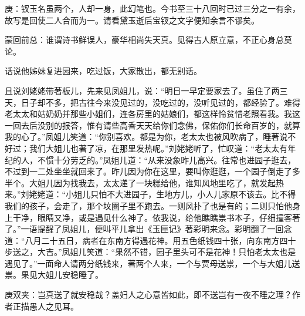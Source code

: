 

\begin{parag}
    \begin{note}庚：钗玉名虽两个，人却一身，此幻笔也。今书至三十八回时已过三分之一有余，故写是回使二人合而为一。请看黛玉逝后宝钗之文字便知余言不谬矣。\end{note}
\end{parag}


\begin{parag}
    \begin{note}蒙回前总：谁谓诗书鲜误人，豪华相尚失天真。见得古人原立意，不正心身总莫论。\end{note}
\end{parag}


\begin{parag}
    话说他姊妹复进园来，吃过饭，大家散出，都无别话。
\end{parag}


\begin{parag}
    且说刘姥姥带著板儿，先来见凤姐儿，说：“明日一早定要家去了。虽住了两三天，日子却不多，把古往今来没见过的，没吃过的，没听见过的，都经验了。难得老太太和姑奶奶并那些小姐们，连各房里的姑娘们，都这样怜贫惜老照看我。我这一回去后没别的报答，惟有请些高香天天给你们念佛，保佑你们长命百岁的，就算我的心了。”凤姐儿笑道：“你别喜欢。都是为你，老太太也被风吹病了，睡著说不好过；我们大姐儿也著了凉，在那里发热呢。”刘姥姥听了，忙叹道：“老太太有年纪的人，不惯十分劳乏的。”凤姐儿道：“从来没象昨儿高兴。往常也进园子逛去，不过到一二处坐坐就回来了。昨儿因为你在这里，要叫你逛逛，一个园子倒走了多半个。大姐儿因为找我去，太太递了一块糕给他，谁知风地里吃了，就发起热来。”刘姥姥道：“小姐儿只怕不大进园子，生地方儿，小人儿家原不该去。比不得我们的孩子，会走了，那个坟圈子里不跑去。一则风扑了也是有的；二则只怕他身上干净，眼睛又净，或是遇见什么神了。依我说，给他瞧瞧祟书本子，仔细撞客著了。”一语提醒了凤姐儿，便叫平儿拿出《玉匣记》著彩明来念。彩明翻了一回念道：“八月二十五日，病者在东南方得遇花神。用五色纸钱四十张，向东南方四十步送之，大吉。”凤姐儿笑道：“果然不错，园子里头可不是花神！只怕老太太也是遇见了。”一面命人请两分纸钱来，著两个人来，一个与贾母送祟，一个与大姐儿送祟。果见大姐儿安稳睡了。\begin{note}庚双夹：岂真送了就安稳哉？盖妇人之心意皆如此，即不送岂有一夜不睡之理？作者正描愚人之见耳。\end{note}
\end{parag}


